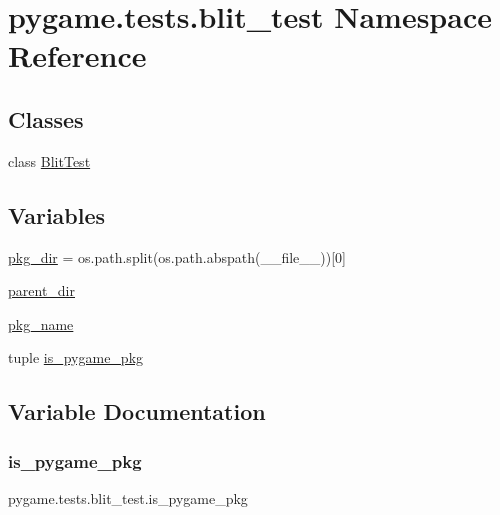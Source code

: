 \hypertarget{namespacepygame_1_1tests_1_1blit__test}{}\section{pygame.\+tests.\+blit\+\_\+test Namespace Reference}
\label{namespacepygame_1_1tests_1_1blit__test}
\subsection*{Classes}
\begin{DoxyCompactItemize}
\item 
class \hyperlink{classpygame_1_1tests_1_1blit__test_1_1_blit_test}{Blit\+Test}
\end{DoxyCompactItemize}
\subsection*{Variables}
\begin{DoxyCompactItemize}
\item 
\hyperlink{namespacepygame_1_1tests_1_1blit__test_a7c9f86da0f976c8d31a0b77e71d0f82c}{pkg\+\_\+dir} = os.\+path.\+split(os.\+path.\+abspath(\+\_\+\+\_\+file\+\_\+\+\_\+))\mbox{[}0\mbox{]}
\item 
\hyperlink{namespacepygame_1_1tests_1_1blit__test_a4120ff3095b543305ed09a9236066947}{parent\+\_\+dir}
\item 
\hyperlink{namespacepygame_1_1tests_1_1blit__test_aa855dd86dac0dfee98fb7fc81508b7e0}{pkg\+\_\+name}
\item 
tuple \hyperlink{namespacepygame_1_1tests_1_1blit__test_a2c656f882ecefe8e4b01c371a8db2333}{is\+\_\+pygame\+\_\+pkg}
\end{DoxyCompactItemize}


\subsection{Variable Documentation}
\mbox{\label{namespacepygame_1_1tests_1_1blit__test_a2c656f882ecefe8e4b01c371a8db2333}} 
\subsubsection{\texorpdfstring{is\+\_\+pygame\+\_\+pkg}{is\_pygame\_pkg}}
{\footnotesize\ttfamily pygame.\+tests.\+blit\+\_\+test.\+is\+\_\+pygame\+\_\+pkg}

